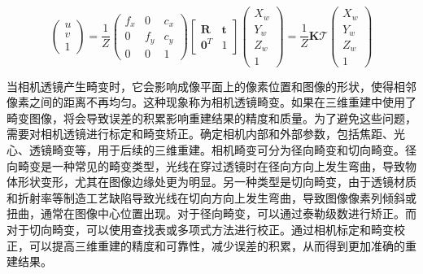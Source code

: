 \begin{equation}
\left(\begin{array}{c}
u \\
v \\
1
\end{array}\right)=\frac{1}{Z}\left(\begin{array}{ccc}
f_{x} & 0 & c_{x} \\
0 & f_{y} & c_{y} \\
0 & 0 & 1
\end{array}\right)\left[\begin{array}{cc}
\boldsymbol{R} & \boldsymbol{t} \\
\mathbf{0}^{T} & 1
\end{array}\right]\left(\begin{array}{c}
X_{w} \\
Y_{w} \\
Z_{w} \\
1
\end{array}\right)=\frac{1}{Z} \boldsymbol{K} \mathcal{T}\left(\begin{array}{c}
X_{w} \\
Y_{w} \\
Z_{w} \\
1
\end{array}\right)
\end{equation}

当相机透镜产生畸变时，它会影响成像平面上的像素位置和图像的形状，使得相邻像素之间的距离不再均匀。这种现象称为相机透镜畸变。如果在三维重建中使用了畸变图像，将会导致误差的积累影响重建结果的精度和质量。为了避免这些问题，需要对相机透镜进行标定和畸变矫正。确定相机内部和外部参数，包括焦距、光心、透镜畸变等，用于后续的三维重建。相机畸变可分为径向畸变和切向畸变。径向畸变是一种常见的畸变类型，光线在穿过透镜时在径向方向上发生弯曲，导致物体形状变形，尤其在图像边缘处更为明显。另一种类型是切向畸变，由于透镜材质和折射率等制造工艺缺陷导致光线在切向方向上发生弯曲，导致图像像素列倾斜或扭曲，通常在图像中心位置出现。对于径向畸变，可以通过泰勒级数进行矫正。而对于切向畸变，可以使用查找表或多项式方法进行校正。通过相机标定和畸变校正，可以提高三维重建的精度和可靠性，减少误差的积累，从而得到更加准确的重建结果。
\vspace{-2em}

